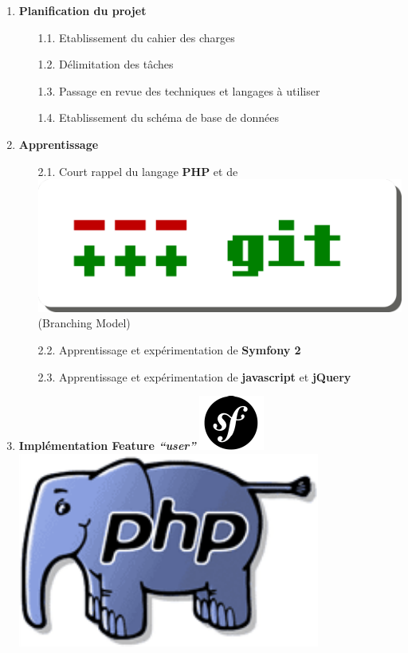 \documentclass{article}
\begin{document}
\begin{sffamily}
\begin{enumerate}
\item \textbf{Planification du projet}
	\begin{enumerate}
		\item[1.1.] Etablissement du cahier des charges
		\item[1.2.] Délimitation des tâches
		\item[1.3.] Passage en revue des techniques et langages à utiliser
		\item[1.4.] Etablissement du schéma de base de données
	\end{enumerate}
		\newpage
\item \textbf{Apprentissage}
	\begin{enumerate}
		\item[2.1.] Court rappel du langage \textbf{PHP} et de \includegraphics[scale=0.05]{git.pdf} (Branching Model)
		\item[2.2.] Apprentissage et expérimentation de \textbf{Symfony 2}
		\item[2.3.] Apprentissage et expérimentation de \textbf{javascript} et \textbf{jQuery}
	\end{enumerate}
\item \textbf{Implémentation Feature \textit{``user''}} \includegraphics[scale=0.5]{symfony.pdf} \includegraphics[scale=0.15]{php.pdf}

\end{enumerate}
\end{sffamily}
\end{document}
